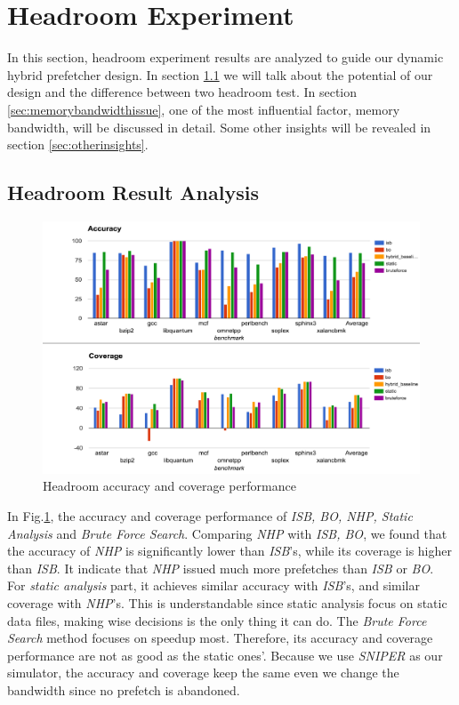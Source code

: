 \section{Headroom Experiment}
\label{sec:headroom}
In this section, headroom experiment results are analyzed to guide our dynamic hybrid prefetcher design. In section \ref{sec:headroomanalysis} we will talk about the potential of our design and the difference between two headroom test. In section \ref{sec:memorybandwidthissue}, one of the most influential factor, memory bandwidth, will be discussed in detail. Some other insights will be revealed in section \ref{sec:otherinsights}.

  \subsection{Headroom Result Analysis}
  \label{sec:headroomanalysis}

  \begin{figure}[ht!]
	   \centering
	   \includegraphics[width=1.0\textwidth]{images/headroom_acc_cov.png}
	   \caption{Headroom accuracy and coverage performance}
	  \label{fig:headroom_acc_cov}
  \end{figure}

  In Fig.\ref{fig:headroom_acc_cov}, the accuracy and coverage performance of \emph{ISB, BO, NHP, Static Analysis} and \emph{Brute Force Search}. Comparing \emph{NHP} with \emph{ISB, BO}, we found that the accuracy of \emph{NHP} is significantly lower than \emph{ISB}'s, while its coverage is higher than \emph{ISB}. It indicate that \emph{NHP} issued much more prefetches than \emph{ISB} or \emph{BO}. For \emph{static analysis} part, it achieves similar accuracy with \emph{ISB}'s, and similar coverage with \emph{NHP}'s. This is understandable since static analysis focus on static data files, making wise decisions is the only thing it can do. The \emph{Brute Force Search} method focuses on speedup most. Therefore, its accuracy and coverage performance are not as good as the static ones'. Because we use \emph{SNIPER} as our simulator, the accuracy and coverage keep the same even we change the bandwidth since no prefetch is abandoned.

